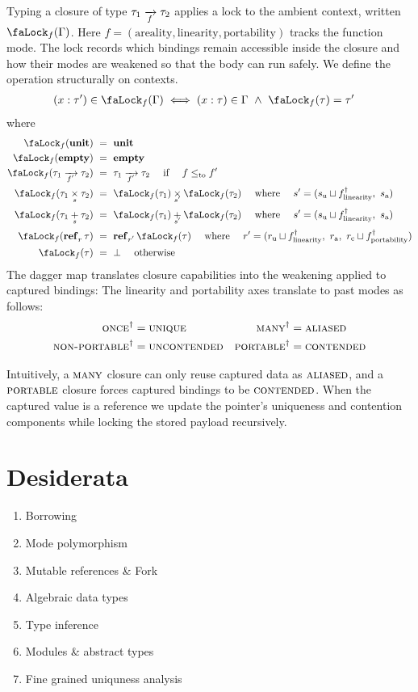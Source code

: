 \documentclass{article}
\newcommand{\kw}[1]{\text{\textbf{#1}}}
\newcommand{\AnnotSub}[1]{%
  \if\relax\detokenize{#1}\relax
  \else
    _{\smash{\raisebox{-0.25ex}{$\scriptstyle #1$}}}
  \fi}
\newcommand{\AnnotArrow}[1]{%
  \if\relax\detokenize{#1}\relax
    \to
  \else
    \xrightarrow[\AnnotBelow{#1}]{}
  \fi}
\newcommand{\AnnotBinop}[2]{%
  \if\relax\detokenize{#2}\relax
    #1
  \else
    \underset{\AnnotBelow{#2}}{#1}
  \fi}
\newcommand{\AnnotBelow}[1]{\smash{\raisebox{0.25ex}{$\scriptstyle #1$}}}
\newcommand{\TFun}[3][]{#2 \mathrel{\AnnotArrow{#1}} #3}
\newcommand{\TPair}[3][]{#2 \mathbin{\AnnotBinop{\times}{#1}} #3}
\newcommand{\TSum}[3][]{#2 \mathbin{\AnnotBinop{+}{#1}} #3}
\newcommand{\TRef}[2][]{\kw{ref}\AnnotSub{#1}\, #2}
\newcommand{\TUnit}{\kw{unit}}
\newcommand{\TEmpty}{\kw{empty}}
\newcommand{\leqto}{\mathrel{\leq_{\mathrm{to}}}}
\newcommand{\mode}[1]{\textsc{#1}}
\newcommand{\Lock}[2][]{
  \text{\faLock}_{#1}(#2)
}
\begin{document}
Typing a closure of type $\TFun[f]{\tau_1}{\tau_2}$ applies a lock to the ambient context, written $\Lock[f]{\Gamma}$. 
Here $f=(\text{areality}, \text{linearity}, \text{portability})$ tracks the function mode. 
The lock records which bindings remain accessible inside the closure and how their modes are weakened so that the body can run safely.
We define the operation structurally on contexts.
\begin{align*}
(x:\tau') \in \Lock[f]{\Gamma} &\iff (x:\tau) \in \Gamma \ \land\ \Lock[f]{\tau} = \tau'
\end{align*}
where
\begin{align*}
  \Lock[f]{\TUnit} &\ =\  \TUnit\\
  \Lock[f]{\TEmpty} &\ =\ \TEmpty\\
  \Lock[f]{\TFun[f']{\tau_1}{\tau_2}} &\ =\ \TFun[f']{\tau_1}{\tau_2} \quad\text{ if }\quad f \leqto f'\\
  \Lock[f]{\TPair[s]{\tau_1}{\tau_2}} &\ =\ \TPair[s']{\Lock[f]{\tau_1}}{\Lock[f]{\tau_2}} \quad\text{ where }\quad s' = (s_{\text{u}} \sqcup f_{\text{linearity}}^\dagger,\ s_{\text{a}})\\
  \Lock[f]{\TSum[s]{\tau_1}{\tau_2}} &\ =\ \TSum[s']{\Lock[f]{\tau_1}}{\Lock[f]{\tau_2}} \quad\text{ where }\quad s' = (s_{\text{u}} \sqcup f_{\text{linearity}}^\dagger,\ s_{\text{a}})\\
  \Lock[f]{\TRef[r]{\tau}} &\ =\ \TRef[r']{\Lock[f]{\tau}} \quad\text{ where }\quad r' = (r_{\text{u}} \sqcup f_{\text{linearity}}^\dagger,\ r_{\text{a}},\ r_{\text{c}} \sqcup f_{\text{portability}}^\dagger)\\
  \Lock[f]{\tau} &\ =\ \bot \quad\text{ otherwise}
\end{align*}
The dagger map translates closure capabilities into the weakening applied to captured bindings:
The linearity and portability axes translate to past modes as follows:
\begin{align*}
\mode{once}^{\dagger} &= \mode{unique} &
\mode{many}^{\dagger} &= \mode{aliased} \\
\mode{non-portable}^{\dagger} &= \mode{uncontended} &
\mode{portable}^{\dagger} &= \mode{contended}
\end{align*}

Intuitively, a $\mode{many}$ closure can only reuse captured data as $\mode{aliased}$, and a $\mode{portable}$ closure forces captured bindings to be $\mode{contended}$.
When the captured value is a reference we update the pointer's uniqueness and contention components while locking the stored payload recursively.

\section{Desiderata}

\begin{enumerate}
  \item Borrowing
  \item Mode polymorphism
  \item Mutable references \& Fork
  \item Algebraic data types
  \item Type inference
  \item Modules \& abstract types
  \item Fine grained uniquness analysis
\end{enumerate}
\end{document}

